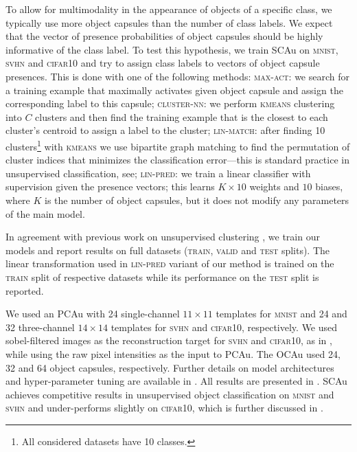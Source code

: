 To allow for multimodality in the appearance of objects of a specific class, we typically use more object capsules than the number of class labels. We expect that the vector of presence probabilities of object capsules should be highly informative of the class label.
To test this hypothesis, we train \gls{SCAu} on \textsc{mnist}, \textsc{svhn} and \textsc{cifar10} and try to assign class labels to vectors of object capsule presences. This is done with one of the following methods: \textsc{max-act}: we search for a training example that maximally activates given object capsule and assign the corresponding label to this capsule; \textsc{cluster-nn}: we perform \textsc{kmeans} clustering into $C$ clusters and then find the training example that is the closest to each cluster’s centroid to assign a label to the cluster; \textsc{lin-match}: after finding 10 clusters\footnote{All considered datasets have 10 classes.} with \textsc{kmeans} we use bipartite graph matching \citep{Kuhn1955hungarian} to find the permutation of cluster indices that minimizes the classification error---this is standard practice in unsupervised classification, see\eg \cite{Ji2018iic};
\textsc{lin-pred}: we train a linear classifier with supervision given the presence vectors; this learns $K \times 10$ weights and $10$ biases, where $K$ is the number of object capsules, but it does not modify any parameters of the main model.

In agreement with previous work on unsupervised clustering \citep{Ji2018iic,Hu2017imsat,Hjelm2019deepinfomax,Haeusser2018adc}, we train our models and report results on full datasets (\textsc{train}, \textsc{valid} and \textsc{test} splits).
The linear transformation used in \textsc{lin-pred} variant of our method is trained on the \textsc{train} split of respective datasets while its performance on the \textsc{test} split is reported.

We used an \gls{PCAu} with 24 single-channel $11\times11$ templates for \textsc{mnist} and 24 and 32 three-channel $14\times14$ templates for \textsc{svhn} and \textsc{cifar10}, respectively.
We used sobel-filtered images as the reconstruction target for \textsc{svhn} and \textsc{cifar10}, as in \cite{Jaiswal2018capsule}, while using the raw pixel intensities as the input to \gls{PCAu}.
The \gls{OCAu} used 24, 32 and 64 object capsules, respectively.
Further details on model architectures and hyper-parameter tuning are available in .
All results are presented in .
\gls{SCAu} achieves competitive results in unsupervised object classification on \textsc{mnist} and \textsc{svhn} and under-performs slightly on \textsc{cifar10}, which is further discussed in .

